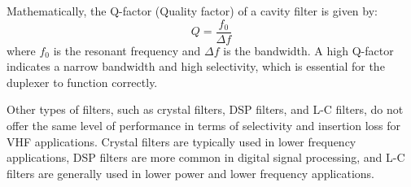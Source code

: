 Mathematically, the Q-factor (Quality factor) of a cavity filter is given by:
\[
Q = \frac{f_0}{\Delta f}
\]
where \( f_0 \) is the resonant frequency and \( \Delta f \) is the bandwidth. A high Q-factor indicates a narrow bandwidth and high selectivity, which is essential for the duplexer to function correctly.

Other types of filters, such as crystal filters, DSP filters, and L-C filters, do not offer the same level of performance in terms of selectivity and insertion loss for VHF applications. Crystal filters are typically used in lower frequency applications, DSP filters are more common in digital signal processing, and L-C filters are generally used in lower power and lower frequency applications.

